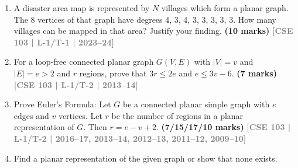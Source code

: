 \documentclass[12pt,a3paper]{article}
\newcommand{\yr}[1]{\hfill\textcolor{gray}{\small\textbf{[#1]}}}
\newcommand{\mk}[1]{\textcolor{orange!70!black}{\small\textbf{(#1 marks)}}}
\begin{document}
\begin{enumerate}


\item A disaster area map is represented by $N$ villages which form a planar graph. The 8 vertices of that graph have degrees 4, 3, 4, 3, 3, 3, 3, 3. How many villages can be mapped in that area? Justify your finding.
\mk{10} \yr{CSE 103 | L-1/T-1 | 2023--24}

\item For a loop-free connected planar graph $G(V, E)$ with $|V| = v$ and $|E| = e > 2$ and $r$ regions, prove that $3r \leq 2e$ and $e \leq 3v - 6$.
\mk{7} \yr{CSE 103 | L-1/T-2 | 2013--14}

\item Prove Euler's Formula: Let $G$ be a connected planar simple graph with $e$ edges and $v$ vertices. Let $r$ be the number of regions in a planar representation of $G$. Then $r = e - v + 2$.
\mk{7/15/17/10} \yr{CSE 103 | L-1/T-2 | 2016--17, 2013--14, 2012--13, 2011--12, 2009--10}


\item Find a planar representation of the given graph or show that none exists.
\begin{center}
\end{center}
\end{enumerate}
\end{document}
